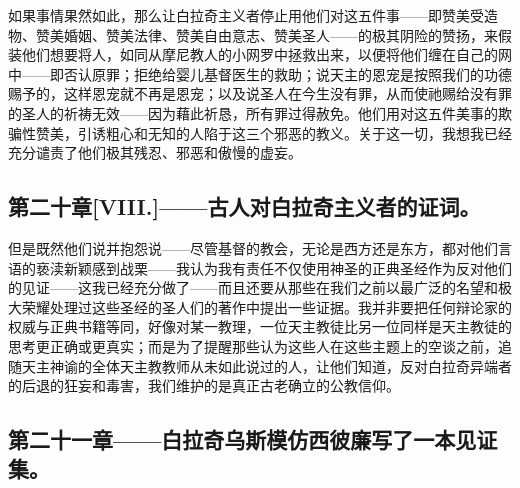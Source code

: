 如果事情果然如此，那么让白拉奇主义者停止用他们对这五件事——即赞美受造物、赞美婚姻、赞美法律、赞美自由意志、赞美圣人——的极其阴险的赞扬，来假装他们想要将人，如同从摩尼教人的小网罗中拯救出来，以便将他们缠在自己的网中——即否认原罪；拒绝给婴儿基督医生的救助；说天主的恩宠是按照我们的功德赐予的，这样恩宠就不再是恩宠；以及说圣人在今生没有罪，从而使祂赐给没有罪的圣人的祈祷无效——因为藉此祈恳，所有罪过得赦免。他们用对这五件美事的欺骗性赞美，引诱粗心和无知的人陷于这三个邪恶的教义。关于这一切，我想我已经充分谴责了他们极其残忍、邪恶和傲慢的虚妄。\par


\subsection{第二十章[VIII.]——古人对白拉奇主义者的证词。}

但是既然他们说并抱怨说——尽管基督的教会，无论是西方还是东方，都对他们言语的亵渎新颖感到战栗——我认为我有责任不仅使用神圣的正典圣经作为反对他们的见证——这我已经充分做了——而且还要从那些在我们之前以最广泛的名望和极大荣耀处理过这些圣经的圣人们的著作中提出一些证据。我并非要把任何辩论家的权威与正典书籍等同，好像对某一教理，一位天主教徒比另一位同样是天主教徒的思考更正确或更真实；而是为了提醒那些认为这些人在这些主题上的空谈之前，追随天主神谕的全体天主教教师从未如此说过的人，让他们知道，反对白拉奇异端者的后退的狂妄和毒害，我们维护的是真正古老确立的公教信仰。\par


\subsection{第二十一章——白拉奇乌斯模仿西彼廉写了一本见证集。}


